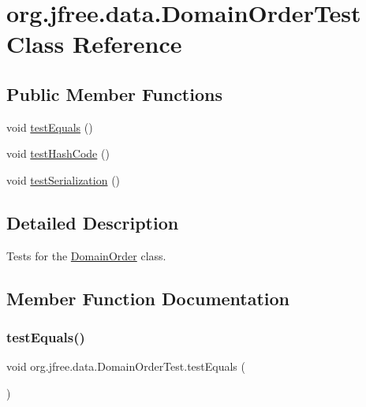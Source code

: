 \hypertarget{classorg_1_1jfree_1_1data_1_1_domain_order_test}{}\section{org.\+jfree.\+data.\+Domain\+Order\+Test Class Reference}
\label{classorg_1_1jfree_1_1data_1_1_domain_order_test}
\subsection*{Public Member Functions}
\begin{DoxyCompactItemize}
\item 
void \mbox{\hyperlink{classorg_1_1jfree_1_1data_1_1_domain_order_test_a5372f2c9cf15e87bdc70fe1886069f58}{test\+Equals}} ()
\item 
void \mbox{\hyperlink{classorg_1_1jfree_1_1data_1_1_domain_order_test_af43890a4771dad1d794f3d62ecae6bc6}{test\+Hash\+Code}} ()
\item 
void \mbox{\hyperlink{classorg_1_1jfree_1_1data_1_1_domain_order_test_a4d3839a61a278e58bbfee546145b2dee}{test\+Serialization}} ()
\end{DoxyCompactItemize}


\subsection{Detailed Description}
Tests for the \mbox{\hyperlink{classorg_1_1jfree_1_1data_1_1_domain_order}{Domain\+Order}} class. 

\subsection{Member Function Documentation}
\mbox{\label{classorg_1_1jfree_1_1data_1_1_domain_order_test_a5372f2c9cf15e87bdc70fe1886069f58}} 
\subsubsection{\texorpdfstring{test\+Equals()}{testEquals()}}
{\footnotesize\ttfamily void org.\+jfree.\+data.\+Domain\+Order\+Test.\+test\+Equals (\begin{DoxyParamCaption}{ }\end{DoxyParamCaption})}

